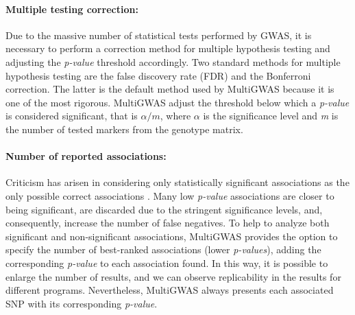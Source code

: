 \documentclass{article}
\begin{document}
\paragraph{Multiple testing correction:}
Due to the massive number of statistical tests performed by GWAS, it is necessary to perform a correction method for multiple hypothesis testing and adjusting the \emph{p-value} threshold accordingly. Two standard methods for multiple hypothesis testing are the false discovery rate (FDR) and the Bonferroni correction. The latter is the default method used by MultiGWAS because it is one of the most rigorous. MultiGWAS adjust the threshold below which a \emph{p-value} is considered significant, that is $\alpha/m$, where $\alpha$ is the significance level and \emph{m }is the number of tested markers from the genotype matrix. 

\paragraph{Number of reported associations:}
Criticism has arisen in considering only statistically significant associations as the only possible correct associations \cite{Thomson2011,Kaler2019}. Many low \emph{p-value} associations are closer to being significant, are discarded due to the stringent significance levels, and, consequently, increase the number of false negatives. To help to analyze both significant and non-significant associations, MultiGWAS provides the option to specify the number of best-ranked associations (lower \emph{p-values}), adding the corresponding \emph{p-value} to each association found. In this way, it is possible to enlarge the number of results, and we can observe replicability in the results for different programs. Nevertheless, MultiGWAS always presents each associated SNP with its corresponding \emph{p-value}.

\end{document}
